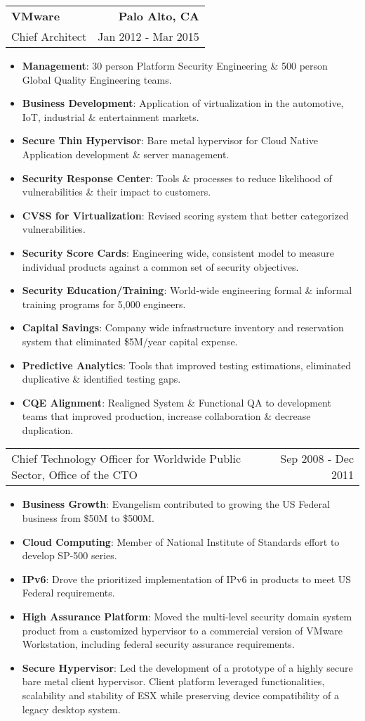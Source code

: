 \documentclass[letterpaper,11pt]{article}
\makeatletter
\newcommand{\resumeCompanyHeading}[4]{
  \vspace{-1pt}
    \item
    \begin{tabular*}{1.0\textwidth}[t]{l@{\extracolsep{\fill}}r}
      \textbf{#1} & \textbf{#2} \\
      {#3} & {#4}
    \end{tabular*}\vspace{-10pt}
  }
\newcommand{\resumeCompanyPositionHeading}[2]{
      \item
      \begin{tabular*}{1.0\textwidth}{l@{\extracolsep{\fill}}r}
        {#1} & {#2}
    \end{tabular*}\vspace{-10pt}
}
\newcommand{\resumeItem}[2]{\item{{\textbf{\small#1}}: {\small#2 \vspace{-1pt}}}}
\newcommand{\resumeItemListStart}{\begin{itemize}}
\newcommand{\resumeItemListEnd}{\end{itemize}}\vspace{-10pt}
\makeatother
\begin{document}
        \resumeCompanyHeading
            {VMware}
            {Palo Alto, CA}
            {Chief Architect}
            {Jan 2012 - Mar 2015}
            \resumeItemListStart
                \resumeItem{Management}{30 person Platform Security Engineering \& 500 person Global Quality Engineering teams.}
                \resumeItem{Business Development}{Application of virtualization in the automotive, IoT, industrial \& entertainment markets.}
                \resumeItem{Secure Thin Hypervisor}{Bare metal hypervisor for Cloud Native Application development \& server management.}
                \resumeItem{Security Response Center}{Tools \& processes to reduce likelihood of vulnerabilities \& their impact to customers.}
                \resumeItem{CVSS for Virtualization}{Revised scoring system that better categorized vulnerabilities.}
                \resumeItem{Security Score Cards}{Engineering wide, consistent model to measure individual products against a common set of security objectives.}
                \resumeItem{Security Education/Training}{World-wide engineering formal \& informal training programs for 5,000 engineers.}
                \resumeItem{Capital Savings}{Company wide infrastructure inventory and reservation system that eliminated \$5M/year capital expense.}
                \resumeItem{Predictive Analytics}{Tools that improved testing estimations, eliminated duplicative \& identified testing gaps.}
                \resumeItem{CQE Alignment}{Realigned System \& Functional QA to development teams that improved production, increase collaboration \& decrease duplication.}
            \resumeItemListEnd
  
          \resumeCompanyPositionHeading
            {Chief Technology Officer for Worldwide Public Sector, Office of the CTO}
            {Sep 2008 - Dec 2011}
            \resumeItemListStart
                \resumeItem{Business Growth}{Evangelism contributed to growing the US Federal business from \$50M to \$500M.}
                \resumeItem{Cloud Computing}{Member of National Institute of Standards effort to develop SP-500 series.}
                \resumeItem{IPv6}{Drove the prioritized implementation of IPv6 in products to meet US Federal requirements.}
                \resumeItem{High Assurance Platform}{Moved the multi-level security domain system product from a customized hypervisor to a 
                  commercial version of VMware Workstation, including federal security assurance requirements.}
                \resumeItem{Secure Hypervisor}{Led the development of a prototype of a highly secure bare metal client hypervisor. Client platform leveraged
                  functionalities, scalability and stability of ESX while preserving device compatibility of a legacy desktop system.}
            \resumeItemListEnd
  
\end{document}
